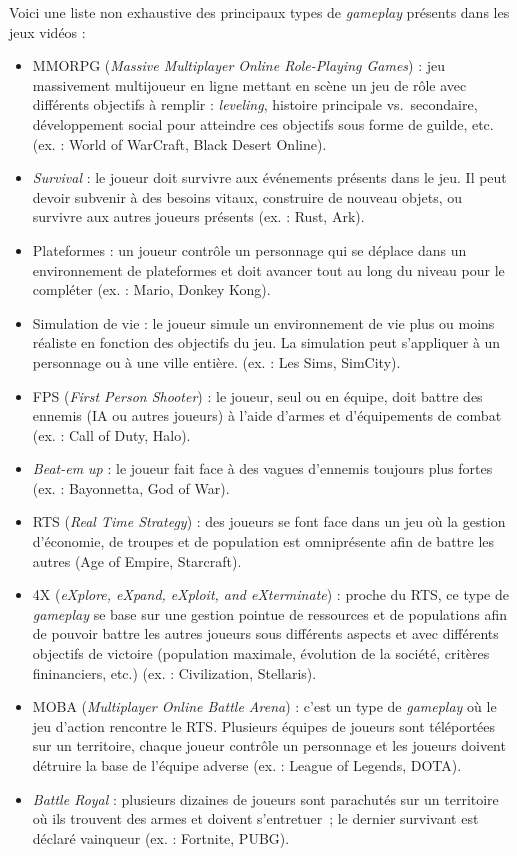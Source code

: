 Voici une liste non exhaustive des principaux types de \emph{gameplay} présents dans les jeux vidéos :
\begin{itemize}
    \item MMORPG (\emph{Massive Multiplayer Online Role-Playing Games}) : jeu massivement multijoueur en ligne mettant en scène un jeu de rôle avec différents objectifs à remplir : \emph{leveling}, histoire principale vs.\ secondaire, développement social pour atteindre ces objectifs sous forme de guilde, etc. (ex. : World of WarCraft, Black Desert Online).
    \item \emph{Survival} : le joueur doit survivre aux événements présents dans le jeu. Il peut devoir subvenir à des besoins vitaux, construire de nouveau objets, ou survivre aux autres joueurs présents (ex. : Rust, Ark).
    \item Plateformes : un joueur contrôle un personnage qui se déplace dans un environnement de plateformes et doit avancer tout au long du niveau pour le compl\'eter (ex. : Mario, Donkey Kong).
    \item Simulation de vie : le joueur simule un environnement de vie plus ou moins réaliste en fonction des objectifs du jeu. La simulation peut s'appliquer à un personnage ou à une ville entière. (ex. : Les Sims, SimCity).
    \item FPS (\emph{First Person Shooter}) : le joueur, seul ou en équipe, doit battre des ennemis (IA ou autres joueurs) à l'aide d'armes et d'équipements de combat (ex. : Call of Duty, Halo).
    \item \emph{Beat-em up} : le joueur fait face à des vagues d'ennemis toujours plus fortes (ex. : Bayonnetta, God of War).
    \item RTS (\emph{Real Time Strategy}) : des joueurs se font face dans un jeu o\`u la gestion d'économie, de troupes et de population est omniprésente afin de battre les autres (Age of Empire, Starcraft).
    \item 4X (\emph{eXplore, eXpand, eXploit, and eXterminate}) : proche du RTS, ce type de \emph{gameplay} se base sur une gestion pointue de ressources et de populations afin de pouvoir battre les autres joueurs sous différents aspects et avec différents objectifs de victoire (population maximale, évolution de la société, critères fininanciers, etc.) (ex. : Civilization, Stellaris).
    \item MOBA (\emph{Multiplayer Online Battle Arena}) : c'est un type de \emph{gameplay} o\`u le jeu d'action rencontre le RTS. Plusieurs équipes de joueurs sont téléportées sur un territoire, chaque joueur contrôle un personnage et les joueurs doivent détruire la base de l'équipe adverse (ex. : League of Legends, DOTA).
    \item \emph{Battle Royal} : plusieurs dizaines de joueurs sont parachutés sur un territoire o\`u ils trouvent des armes et doivent s'entretuer~; le dernier survivant est déclaré vainqueur (ex. : Fortnite, PUBG).
\end{itemize}

